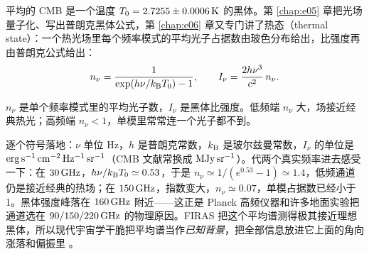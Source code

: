 平均的 CMB 是一个温度 \(T_0=2.7255\pm0.0006\,{\rm K}\) 的黑体。第 \ref{chap:e05} 章把光场量子化、写出普朗克黑体公式，第 \ref{chap:e06} 章又专门讲了热态（thermal state）：一个热光场里每个频率模式的平均光子占据数由玻色分布给出，比强度再由普朗克公式给出：
\begin{equation}
  n_\nu=\frac{1}{\exp(h\nu/k_{\rm B}T_0)-1},
  \qquad
  I_\nu=\frac{2h\nu^3}{c^2}\,n_\nu .
  \label{eq:e23-planck-spectrum}
\end{equation}
\begin{formulaexplain}
\(n_\nu\) 是单个频率模式里的平均光子数，\(I_\nu\) 是黑体比强度。低频端 \(n_\nu\) 大，场接近经典热光；高频端 \(n_\nu<1\)，单模里常常连一个光子都不到。
\end{formulaexplain}
逐个符号落地：\(\nu\) 单位 Hz，\(h\) 是普朗克常数，\(k_{\rm B}\) 是玻尔兹曼常数，\(I_\nu\) 的单位是 \({\rm erg\,s^{-1}\,cm^{-2}\,Hz^{-1}\,sr^{-1}}\)（CMB 文献常换成 \({\rm MJy\,sr^{-1}}\)）。代两个真实频率进去感受一下：在 \(30\,{\rm GHz}\)，\(h\nu/k_{\rm B}T_0\simeq0.53\)，于是 \(n_\nu\simeq1/(e^{0.53}-1)\simeq1.4\)，低频通道仍是接近经典的热场；在 \(150\,{\rm GHz}\)，指数变大，\(n_\nu\simeq0.07\)，单模占据数已经小于 1。黑体强度峰落在 \(160\,{\rm GHz}\) 附近——这正是 Planck 高频仪器和许多地面实验把通道选在 \(90/150/220\,{\rm GHz}\) 的物理原因。FIRAS 把这个平均谱测得极其接近理想黑体，所以现代宇宙学干脆把平均谱当作\emph{已知背景}，把全部信息放进它上面的角向涨落和偏振里 \citep{1994ApJ...420..439M,1996ApJ...473..576F,2009ApJ...707..916F}。

